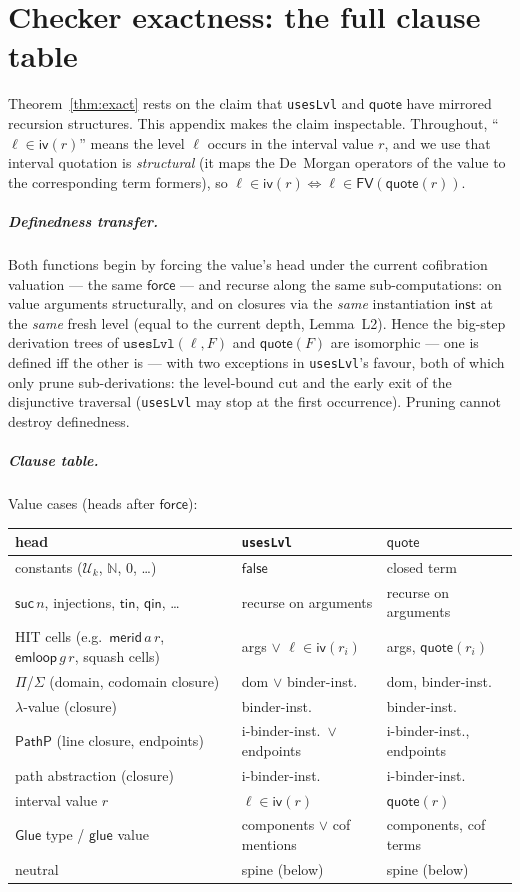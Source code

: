 \documentclass{lmcs}
\newcommand{\Glue}{\mathsf{Glue}}
\newcommand{\glue}{\mathsf{glue}}
\newcommand{\FV}{\mathsf{FV}}
\newcommand{\U}{\mathcal{U}}
\newcommand{\quo}{\mathsf{quote}}
\newcommand{\capp}{\mathsf{inst}}
\begin{document}
\section{Checker exactness: the full clause table}
\label{app:exact}

Theorem~\ref{thm:exact} rests on the claim that \texttt{usesLvl} and
$\quo$ have mirrored recursion structures.  This appendix makes the
claim inspectable.  Throughout, ``$\ell \in \mathsf{iv}(r)$'' means
the level $\ell$ occurs in the interval value $r$, and we use that
interval quotation is \emph{structural} (it maps the De~Morgan
operators of the value to the corresponding term formers), so
$\ell \in \mathsf{iv}(r) \iff \ell \in \FV(\quo(r))$.

\subparagraph*{Definedness transfer.}  Both functions begin by
forcing the value's head under the current cofibration valuation ---
the same $\mathsf{force}$ --- and recurse along the same
sub-computations: on value arguments structurally, and on closures
via the \emph{same} instantiation $\capp$ at the \emph{same} fresh
level (equal to the current depth, Lemma~L2).  Hence the big-step
derivation trees of $\texttt{usesLvl}(\ell, F)$ and $\quo(F)$ are
isomorphic --- one is defined iff the other is --- with two
exceptions in \texttt{usesLvl}'s favour, both of which only prune
sub-derivations: the level-bound cut and the early exit of the
disjunctive traversal (\texttt{usesLvl} may stop at the first
occurrence).  Pruning cannot destroy definedness.

\subparagraph*{Clause table.}  Value cases (heads after
$\mathsf{force}$):

\begin{center}
\footnotesize
\begin{tabular}{lll}
  head & \texttt{usesLvl} & $\quo$ \\\hline
  constants ($\U_k$, $\mathbb{N}$, $0$, \dots) &
    $\mathsf{false}$ & closed term \\
  $\mathsf{suc}\,n$, injections, $\mathsf{tin}$, $\mathsf{qin}$,
    \dots & recurse on arguments & recurse on arguments \\
  HIT cells (e.g.\ $\mathsf{merid}\,a\,r$,
    $\mathsf{emloop}\,g\,r$, squash cells) &
    args $\lor$ $\ell \in \mathsf{iv}(r_i)$ &
    args, $\quo(r_i)$ \\
  $\Pi$/$\Sigma$ (domain, codomain closure) &
    dom $\lor$ binder-inst.\ & dom, binder-inst.\ \\
  $\lambda$-value (closure) & binder-inst.\ & binder-inst.\ \\
  $\mathsf{PathP}$ (line closure, endpoints) &
    i-binder-inst.\ $\lor$ endpoints &
    i-binder-inst., endpoints \\
  path abstraction (closure) & i-binder-inst.\ &
    i-binder-inst.\ \\
  interval value $r$ & $\ell \in \mathsf{iv}(r)$ & $\quo(r)$ \\
  $\Glue$ type / $\glue$ value &
    components $\lor$ cof mentions & components, cof terms \\
  neutral & spine (below) & spine (below) \\
\end{tabular}
\end{center}
\end{document}
